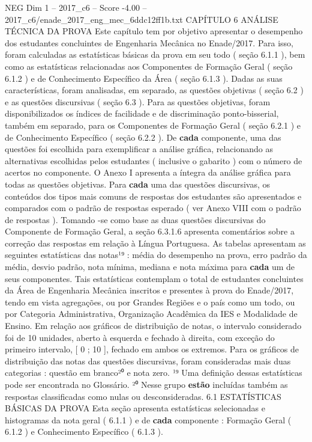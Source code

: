 \begin{textsample}{NEG Dim 1 – 2017\_c6 – Score -4.00 – 2017\_c6/enade\_2017\_eng\_mec\_6ddc12ff1b.txt}  \label{ex:f1_neg_148}
CAPÍTULO 6 ANÁLISE TÉCNICA DA PROVA Este capítulo tem por objetivo apresentar o desempenho dos estudantes concluintes de Engenharia Mecânica no Enade/2017.
Para isso, foram calculadas as estatísticas básicas da prova em seu todo ( seção 6.1.1 ), bem como as estatísticas relacionadas aos Componentes de Formação Geral ( seção 6.1.2 ) e de Conhecimento Específico da Área ( seção 6.1.3 ).
Dadas as suas características, foram analisadas, em separado, as questões objetivas ( seção 6.2 ) e as questões discursivas ( seção 6.3 ).
Para as questões objetivas, foram disponibilizados os índices de facilidade e de discriminação ponto-bisserial, também em separado, para os Componentes de Formação Geral ( seção 6.2.1 ) e de Conhecimento Específico ( seção 6.2.2 ).
De \textbf{cada} componente, uma das questões foi escolhida para exemplificar a análise gráfica, relacionando as alternativas escolhidas pelos estudantes ( inclusive o gabarito ) com o número de acertos no componente.
O Anexo I apresenta a íntegra da análise gráfica para todas as questões objetivas.
Para \textbf{cada} uma das questões discursivas, os conteúdos dos tipos mais comuns de respostas dos estudantes são apresentados e comparados com o padrão de respostas esperado ( ver Anexo VIII com o padrão de respostas ).
Tomando -se como base as duas questões discursivas do Componente de Formação Geral, a seção 6.3.1.6 apresenta comentários sobre a correção das respostas em relação à Língua Portuguesa.
As tabelas apresentam as seguintes estatísticas das notas¹⁹ : média do desempenho na prova, erro padrão da média, desvio padrão, nota mínima, mediana e nota máxima para \textbf{cada} um de seus componentes.
Tais estatísticas contemplam o total de estudantes concluintes da Área de Engenharia Mecânica inscritos e presentes à prova do Enade/2017, tendo em vista agregações, ou por Grandes Regiões e o país como um todo, ou por Categoria Administrativa, Organização Acadêmica da IES e Modalidade de Ensino.
Em relação aos gráficos de distribuição de notas, o intervalo considerado foi de 10 unidades, aberto à esquerda e fechado à direita, com exceção do primeiro intervalo, [ 0 ; 10 ], fechado em ambos os extremos.
Para os gráficos de distribuição das notas das questões discursivas, foram consideradas mais duas categorias : questão em branco²⁰ e nota zero. ¹⁹ Uma definição dessas estatísticas pode ser encontrada no Glossário. ²⁰ Nesse grupo \textbf{estão} incluídas também as respostas classificadas como nulas ou desconsideradas. 6.1 ESTATÍSTICAS BÁSICAS DA PROVA Esta seção apresenta estatísticas selecionadas e histogramas da nota geral ( 6.1.1 ) e de \textbf{cada} componente : Formação Geral ( 6.1.2 ) e Conhecimento Específico ( 6.1.3 ).

\end{textsample}
